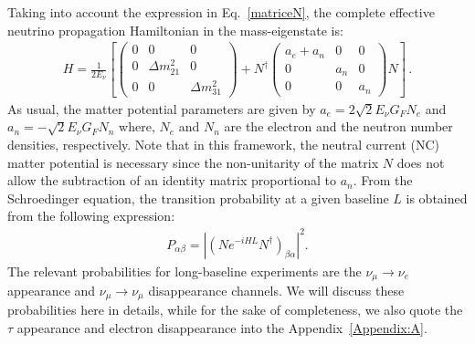 \documentclass[11pt,a4paper]{article}
\begin{document}
Taking into account the expression in Eq.~\ref{matriceN},  the complete effective neutrino propagation Hamiltonian in the mass-eigenstate is: 
\begin{eqnarray} \label{evol}
H= \frac{1}{2 E_\nu} \left[\left( \begin{array}{ccc}
                   0   & 0          & 0   \\
                   0   &  \Delta m^2_{21}  & 0  \\
                   0   & 0           &  \Delta m^2_{31}  
                   \end{array} \right)  +  N^{\dagger}
                  \left( \begin{array}{ccc}
            a_e + a_n      & 0 & 0 \\
            0  & a_n  & 0 \\
            0 & 0 & a_n
                   \end{array} 
                   \right) N\right]
\, .
\label{eq:matter}
\end{eqnarray}
As usual, the matter potential parameters are given by
$a_e= 2 \sqrt{2} E_\nu G_F N_e$ and $a_n= -\sqrt{2} E_\nu G_F N_n$ where, $N_e$ and $N_n$ are the electron and the neutron number densities, respectively. Note that in this framework, the neutral current (NC) matter potential is necessary since the non-unitarity of the matrix $N$ does not allow the subtraction of an identity matrix proportional to $a_n$. 
From the Schroedinger equation, the transition probability at a given baseline $L$ is obtained from the following expression:
\begin{eqnarray}
P_{\alpha\beta}=|(N e^{-i H L}N^\dagger)_{\beta\alpha}|^2.
\end{eqnarray}
The relevant probabilities for long-baseline experiments are the $\nu_{\mu}\rightarrow\nu_e$ appearance and $\nu_\mu\rightarrow\nu_\mu$ disappearance channels. We will discuss these probabilities here in details, while for the sake of completeness, we also quote the $\tau$ appearance and electron disappearance into the Appendix~\ref{Appendix:A}.
\end{document}
